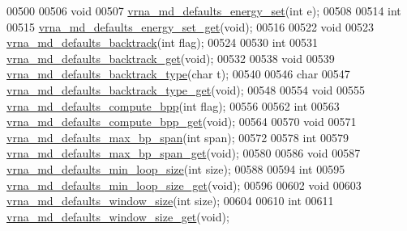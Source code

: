\begin{DoxyCode}
00500 
00506 \textcolor{keywordtype}{void}
00507 \hyperlink{group__model__details_ga8dd29c55787a4576277e1907e92d810c}{vrna\_md\_defaults\_energy\_set}(\textcolor{keywordtype}{int} e);
00508 
00514 \textcolor{keywordtype}{int}
00515 \hyperlink{group__model__details_ga017ed6afb1cba2b7f242412cab618b53}{vrna\_md\_defaults\_energy\_set\_get}(\textcolor{keywordtype}{void});
00516 
00522 \textcolor{keywordtype}{void}
00523 \hyperlink{group__model__details_ga978c468b2fe96a70d5191e3dd17d5599}{vrna\_md\_defaults\_backtrack}(\textcolor{keywordtype}{int} flag);
00524 
00530 \textcolor{keywordtype}{int}
00531 \hyperlink{group__model__details_ga90da1156e6883ddd68527c2830706648}{vrna\_md\_defaults\_backtrack\_get}(\textcolor{keywordtype}{void});
00532 
00538 \textcolor{keywordtype}{void}
00539 \hyperlink{group__model__details_ga68305274de96b56b7799575e222560d8}{vrna\_md\_defaults\_backtrack\_type}(\textcolor{keywordtype}{char} t);
00540 
00546 \textcolor{keywordtype}{char}
00547 \hyperlink{group__model__details_ga1425b4ebd0e034dead66d79becd64143}{vrna\_md\_defaults\_backtrack\_type\_get}(\textcolor{keywordtype}{void});
00548 
00554 \textcolor{keywordtype}{void}
00555 \hyperlink{group__model__details_gaf1b5db10f1f476767f9a95f8a78e3132}{vrna\_md\_defaults\_compute\_bpp}(\textcolor{keywordtype}{int} flag);
00556 
00562 \textcolor{keywordtype}{int}
00563 \hyperlink{group__model__details_gaa3a537e61fbe0518673bf9f73fd820f3}{vrna\_md\_defaults\_compute\_bpp\_get}(\textcolor{keywordtype}{void});
00564 
00570 \textcolor{keywordtype}{void}
00571 \hyperlink{group__model__details_ga4c4bc962f09b4480cb8499f1cf8ae4ec}{vrna\_md\_defaults\_max\_bp\_span}(\textcolor{keywordtype}{int} span);
00572 
00578 \textcolor{keywordtype}{int}
00579 \hyperlink{group__model__details_gaa60f989e062fecd4d4bac89c1883da85}{vrna\_md\_defaults\_max\_bp\_span\_get}(\textcolor{keywordtype}{void});
00580 
00586 \textcolor{keywordtype}{void}
00587 \hyperlink{group__model__details_gac152f1e78c1058a10261022c8dfda0f7}{vrna\_md\_defaults\_min\_loop\_size}(\textcolor{keywordtype}{int} size);
00588 
00594 \textcolor{keywordtype}{int}
00595 \hyperlink{group__model__details_ga5cc691174a75c652807dc361b617632a}{vrna\_md\_defaults\_min\_loop\_size\_get}(\textcolor{keywordtype}{void});
00596 
00602 \textcolor{keywordtype}{void}
00603 \hyperlink{group__model__details_ga7b802ce0e8c3181bf5cb580de6d5b26a}{vrna\_md\_defaults\_window\_size}(\textcolor{keywordtype}{int} size);
00604 
00610 \textcolor{keywordtype}{int}
00611 \hyperlink{group__model__details_ga670146a9aa3ba77f4d422d60b7c30ac9}{vrna\_md\_defaults\_window\_size\_get}(\textcolor{keywordtype}{void});

\end{DoxyCode}
